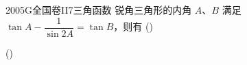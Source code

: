 
\begin{problem}{2005}{G}{全国卷II}{7}{三角函数}
锐角三角形的内角 $ A $、$ B $ 满足 $ \tan A-\dfrac{1}{\sin 2A}=\tan B $，则有 (\hspace{1cm})

(\hspace{1cm})
\begin{choices}
\end{choices}
\end{problem}

\begin{answer}

\end{answer}

\begin{solutions}

\end{solutions}